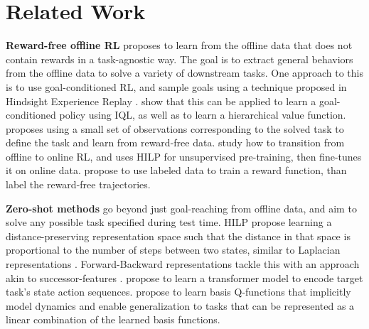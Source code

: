 \section{Related Work}
\textbf{Reward-free offline RL} proposes to learn from the offline data that does not contain rewards in a task-agnostic way.
The goal is to extract general behaviors from the offline data to solve a variety of downstream tasks. 
One approach to this is to use goal-conditioned RL, and sample goals using a technique proposed in Hindsight Experience Replay \citep{andrychowicz2017hindsight}. \citet{park2024hiql} show that this can be applied to learn a goal-conditioned
policy using IQL, as well as to learn a hierarchical value function. \citet{hatch2022example} proposes using a small
set of observations corresponding to the solved task to define the task and learn from reward-free data. \citet{kim2024unsupervised} study how to transition from offline to online RL, and uses HILP \citep{park2024foundation} for unsupervised pre-training, then fine-tunes it on online data. \citet{yu2022leverage, hu2023provable} propose to use labeled data to train a reward function, than label the reward-free trajectories.

\textbf{Zero-shot methods} go beyond just goal-reaching from offline data, and aim to solve any possible task specified during test time. 
HILP \citep{park2024foundation} propose learning a distance-preserving representation space such that the distance in that space is proportional to the number of steps between two states, similar to Laplacian representations \citep{wu2018laplacian, wang2021towards, wang2022reachability}. Forward-Backward representations \citep{touati2021learning, touati2022does} tackle this with an approach akin to successor-features \citep{barreto2017successor}.  \citet{frans2024unsupervised} propose to learn a transformer model to encode target task's state action sequences. \citet{Chen_Zhu_Agrawal_Zhang_Gupta_2023} propose to learn basis Q-functions that implicitly model dynamics and enable generalization to tasks that can be represented as a linear combination of the learned basis functions.

